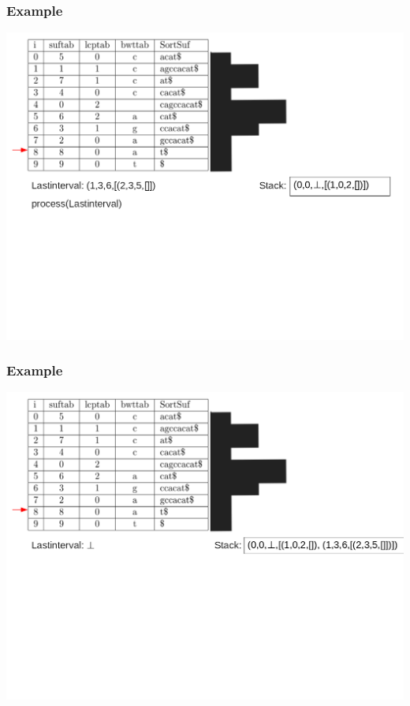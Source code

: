 \documentclass[compress,handout]{beamer} %
\begin{document}
\begin{frame}
	\frametitle{Example}
	\includegraphics[width=\textwidth, height=\textheight, keepaspectratio=true]{traversal_12}
\end{frame}

\begin{frame}
	\frametitle{Example}
	\includegraphics[width=\textwidth, height=\textheight, keepaspectratio=true]{traversal_13}
\end{frame}
\end{document}
